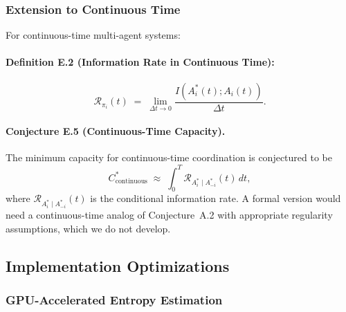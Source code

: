 \documentclass[10pt, letterpaper]{article}
\begin{document}
\subsubsection{Extension to Continuous Time}

For continuous-time multi-agent systems:

\paragraph{Definition E.2 (Information Rate in Continuous Time):}
\[\mathcal{R}_{\pi_i}(t) \;=\; \lim_{\Delta t \to 0} \frac{I(A_i^*(t); A_i(t))}{\Delta t}.\]

\paragraph{Conjecture E.5 (Continuous-Time Capacity).} The minimum capacity for continuous-time coordination is conjectured to be
\[C^*_{\text{continuous}} \;\approx\; \int_0^T \mathcal{R}_{A_i^* \mid A_{-i}^*}(t)\, dt,\]
where $\mathcal{R}_{A_i^* \mid A_{-i}^*}(t)$ is the conditional information rate. A formal version would need a continuous-time analog of Conjecture~A.2 with appropriate regularity assumptions, which we do not develop.

\subsection{Implementation Optimizations}

\subsubsection{GPU-Accelerated Entropy Estimation}
\end{document}
